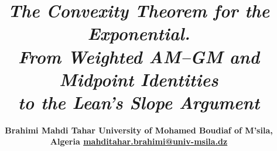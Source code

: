 \documentclass[11pt,reqno]{amsart}
\makeatletter
\theoremstyle{redplain}
\let\orig@maketitle\maketitle
\renewcommand{\maketitle}{\begingroup\let\MakeUppercase\@firstofone\let\uppercase\@firstofone\orig@maketitle\endgroup}
\numberwithin{equation}{section}
\makeatother
\begin{document}
\title{\bfseries{\huge \emph{The Convexity Theorem for the Exponential.}}\\
[12pt]{\Large \emph{From Weighted AM--GM and Midpoint Identities}}\\
[6pt]{\Large \emph{to the Lean's Slope Argument}}}
\author{%
\bfseries{\large \hspace{1.2in} Brahimi Mahdi Tahar\newline\text{ \ 
} \newline\text{ \  } \hspace{0.5in}\text{ \  } University of Mohamed
Boudiaf of M'sila, Algeria\newline\text{ \  }
\newline\href{mailto:mahditahar.brahimi@univ-msila.dz}{mahditahar.brahimi@univ-msila.dz}}%
}
\maketitle
\end{document}
